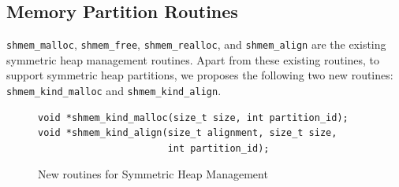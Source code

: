 



\subsection{Memory Partition Routines}
\label{src:smempart/routines}
\texttt{shmem\_malloc}, \texttt{shmem\_free}, \texttt{shmem\_realloc},
and \texttt{shmem\_align} are the existing symmetric heap management
routines. Apart from these existing routines, %
to support symmetric heap partitions, we proposes the
following two new routines: \texttt{shmem\_kind\_malloc} and
\texttt{shmem\_kind\_align}.

\begin{figure}
    \lstset{language=c,
            keywordstyle=\bfseries,
            basicstyle=\tt\small,
            frame=single}
    \vspace{-10pt}
    \begin{lstlisting}
void *shmem_kind_malloc(size_t size, int partition_id);
void *shmem_kind_align(size_t alignment, size_t size,
                       int partition_id);
    \end{lstlisting}
    \vspace{-10pt}
    \caption{New routines for Symmetric Heap Management}
    \vspace{-20pt}
    \label{fig:routines}
\end{figure}

